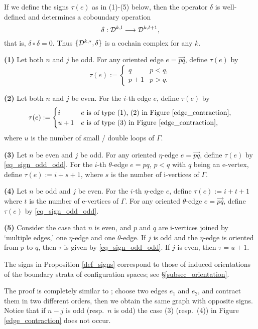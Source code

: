 \begin{prop}\label{def_signs}
If we define the signs $\tau (e)$ as in (1)-(5) below, then the operator $\delta$ is well-defined and determines
a coboundary operation
\[
 \delta : \mathcal{D}^{k,l} \longrightarrow \mathcal{D}^{k,l+1},
\]
that is, $\delta \circ \delta =0$.
Thus $\{ \mathcal{D}^{k,*}, \delta \}$ is a cochain complex for any $k$.


{\bf (1)} Let both $n$ and $j$ be odd.
For any oriented edge $e=\overrightarrow{pq}$, define $\tau (e)$ by
\begin{equation}\label{eq_sign_odd_odd}
 \tau (e) :=
 \begin{cases}
  q   & p<q, \\
  p+1 & p>q.
 \end{cases}
\end{equation}


{\bf (2)} Let both $n$ and $j$ be even.
For the $i$-th edge $e$, define $\tau (e)$ by
\[
 \tau (e) :=
 \begin{cases}
  i   & e \text{ is of type (1), (2) in Figure \ref{edge_contraction}}, \\
  u+1 & e \text{ is of type (3) in Figure \ref{edge_contraction}},
 \end{cases}
\]
where $u$ is the number of small / double loops of $\Gamma$.


{\bf (3)} Let $n$ be even and $j$ be odd.
For any oriented $\eta$-edge $e=\overrightarrow{pq}$, define $\tau (e)$ by \eqref{eq_sign_odd_odd}.
For the $i$-th $\theta$-edge $e=pq$, $p<q$ with $q$ being an e-vertex, define $\tau (e):=i+s+1$, where $s$ is the number
of i-vertices of $\Gamma$.


{\bf (4)} Let $n$ be odd and $j$ be even.
For the $i$-th $\eta$-edge $e$, define $\tau (e):=i+t+1$ where $t$ is the number of e-vertices of $\Gamma$.
For any oriented $\theta$-edge $e=\overrightarrow{pq}$, define $\tau (e)$ by \eqref{eq_sign_odd_odd}.


{\bf (5)} Consider the case that $n$ is even, and $p$ and $q$ are i-vertices joined by `multiple edges,' one $\eta$-edge
and one $\theta$-edge.
If $j$ is odd and the $\eta$-edge is oriented from $p$ to $q$, then $\tau$ is given by \eqref{eq_sign_odd_odd}.
If $j$ is even, then $\tau =u+1$.
\end{prop}


\begin{rem}
The signs in Proposition \ref{def_signs} correspond to those of induced orientations of the boundary strata of
configuration spaces; see \S \ref{subsec_orientation}.
\end{rem}


The proof is completely similar to \cite[Theorem 4.2]{CCL02}; choose two edges $e_1$ and $e_2$, and contract them
in two different orders, then we obtain the same graph with opposite signs.
Notice that if $n-j$ is odd (resp.\ $n$ is odd) the case (3) (resp.\ (4)) in Figure \ref{edge_contraction} does not occur.